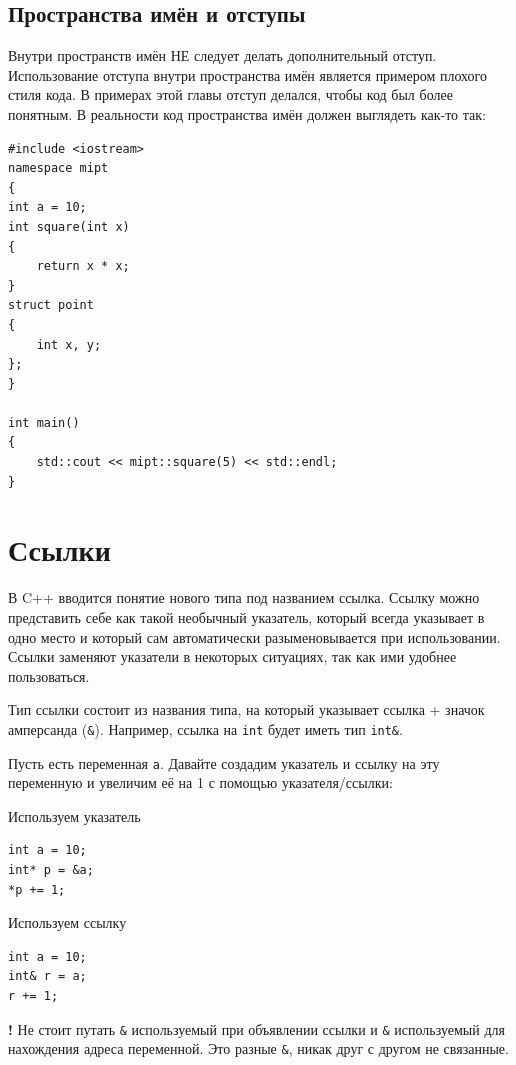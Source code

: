 \documentclass{article}
\begin{document}
\subsection*{Пространства имён и отступы}
Внутри пространств имён НЕ следует делать дополнительный отступ. Использование отступа внутри пространства имён является примером плохого стиля кода. В примерах этой главы отступ делался, чтобы код был более понятным. В реальности код пространства имён должен выглядеть как-то так:
\begin{lstlisting}
#include <iostream>
namespace mipt 
{
int a = 10;
int square(int x)
{
    return x * x;
}
struct point
{
    int x, y;
};
}

int main()
{
    std::cout << mipt::square(5) << std::endl;
}
\end{lstlisting}
\newpage
\section*{Ссылки}
В C++ вводится понятие нового типа под названием ссылка.
Ссылку можно представить себе как такой необычный указатель, который всегда указывает в одно место и который сам автоматически разыменовывается при использовании. Ссылки заменяют указатели в некоторых ситуациях, так как ими удобнее пользоваться.

Тип ссылки состоит из названия типа, на который указывает ссылка + значок амперсанда (\texttt{\&}). Например, ссылка на \texttt{int} будет иметь тип \texttt{int\&}.

Пусть есть переменная \texttt{a}. Давайте создадим указатель и ссылку на эту переменную и увеличим её на 1 с помощью указателя/ссылки:
\begin{multicols}{2}
Используем указатель
\begin{lstlisting}
int a = 10;
int* p = &a;
*p += 1;
\end{lstlisting}

Используем ссылку
\begin{lstlisting}
int a = 10;
int& r = a;
r += 1;
\end{lstlisting}
\end{multicols}

\textbf{\large{!}} \quad Не стоит путать \texttt{\&} используемый при объявлении ссылки и \texttt{\&} используемый для нахождения адреса переменной. Это разные \texttt{\&}, никак друг с другом не связанные.\\
\end{document}
